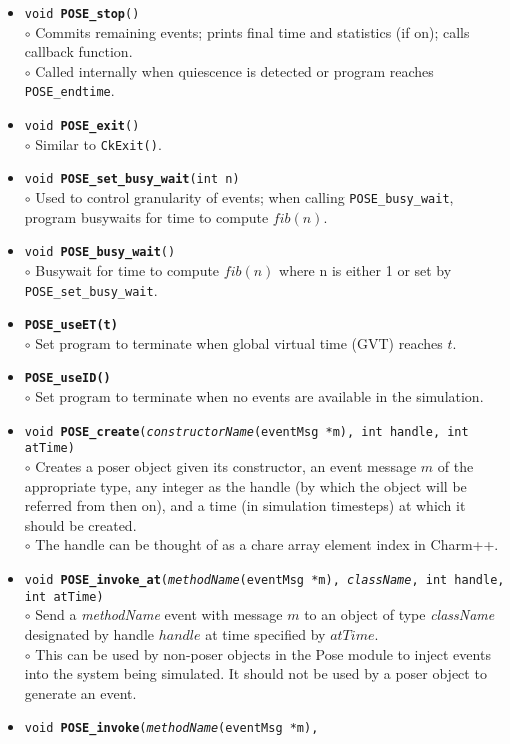 \documentclass[10pt]{article}
\newcommand{\pose}{{\sc Pose}}
\begin{document}
\begin{itemize}
\item {\tt void {\bf POSE\_stop}()}\\
	$\circ$ Commits remaining events; prints final time and
	statistics (if on); calls callback function.\\
	$\circ$ Called internally when quiescence is detected or
	program reaches {\tt POSE\_endtime}.
\item {\tt void {\bf POSE\_exit}()}\\
	$\circ$ Similar to {\tt CkExit()}.
\item {\tt void {\bf POSE\_set\_busy\_wait}(int n)}\\
	$\circ$ Used to control granularity of events; when calling
	{\tt POSE\_busy\_wait}, program busywaits for time to compute $fib(n)$.
\item {\tt void {\bf POSE\_busy\_wait}()}\\
	$\circ$ Busywait for time to compute $fib(n)$ where n is either
	1 or set by {\tt POSE\_set\_busy\_wait}.
\item {\tt {\bf POSE\_useET(t)}}\\
	$\circ$ Set program to terminate when global
	virtual time (GVT) reaches $t$.
\item {\tt {\bf POSE\_useID()}}\\
	$\circ$ Set program to terminate when no events are available
	in the simulation.
\item {\tt void {\bf POSE\_create}({\it constructorName}(eventMsg *m), int
handle, int atTime)}\\
	$\circ$ Creates a poser object given its constructor, an event
	message $m$ of the appropriate type, any integer as the handle
	(by which the object will be referred from then on), and a
	time (in simulation timesteps) at which it should be created.\\ 
	$\circ$ The handle can be thought of as a chare array element
	index in Charm++.
\item {\tt void {\bf POSE\_invoke\_at}({\it methodName}(eventMsg *m),
{\it className}, int handle, int atTime)}\\
	$\circ$ Send a {\it methodName} event with message $m$ to an
	object of type {\it className} designated by handle $handle$
	at time specified by $atTime$.\\
	$\circ$ This can be used by non-poser objects in the \pose{}
	module to inject events into the system being simulated.  It
	should not be used by a poser object to generate an event.
\item {\tt void {\bf POSE\_invoke}({\it methodName}(eventMsg *m),
}
\end{itemize}
\end{document}
